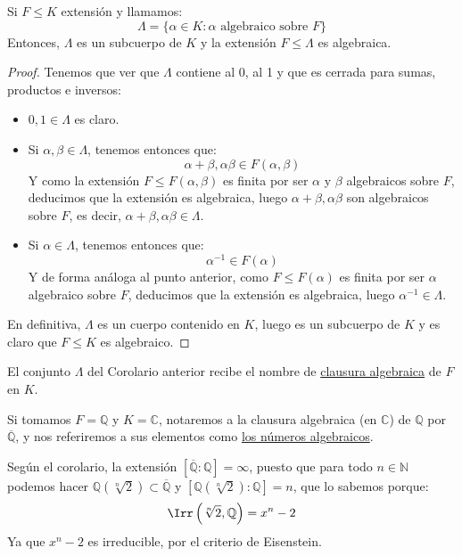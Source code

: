 \begin{coro}
    Si $F\leq K$ extensión y llamamos:
    \begin{equation*}
        \Lambda = \{\alpha\in K : \alpha \text{\ algebraico sobre\ } F\}
    \end{equation*}
    Entonces, $\Lambda$ es un subcuerpo de $K$ y la extensión $F\leq \Lambda$ es algebraica.
    \begin{proof}
        Tenemos que ver que $\Lambda$ contiene al 0, al 1 y que es cerrada para sumas, productos e inversos:
        \begin{itemize}
            \item $0,1\in \Lambda$ es claro.
            \item Si $\alpha,\beta\in \Lambda$, tenemos entonces que:
                \begin{equation*}
                    \alpha+\beta, \alpha\beta\in F(\alpha,\beta)
                \end{equation*}
                Y como la extensión $F\leq F(\alpha,\beta)$ es finita por ser $\alpha$ y $\beta$ algebraicos sobre $F$, deducimos que la extensión es algebraica, luego $\alpha+\beta,\alpha\beta$ son algebraicos sobre $F$, es decir, $\alpha+\beta,\alpha\beta\in \Lambda$.
            \item Si $\alpha\in \Lambda$, tenemos entonces que:
                \begin{equation*}
                    \alpha^{-1}\in F(\alpha)
                \end{equation*}
                Y de forma análoga al punto anterior, como $F\leq F(\alpha)$ es finita por ser $\alpha$ algebraico sobre $F$, deducimos que la extensión es algebraica, luego $\alpha^{-1}\in \Lambda$. 
        \end{itemize}
        En definitiva, $\Lambda$ es un cuerpo contenido en $K$, luego es un subcuerpo de $K$ y es claro que $F\leq K$ es algebraico.
    \end{proof}
\end{coro}

\begin{definicion}
    El conjunto $\Lambda$ del Corolario anterior recibe el nombre de \underline{clausura algebraica} de $F$ en $K$.
\end{definicion}

\begin{ejemplo}
    Si tomamos $F = \mathbb{Q}$ y $K = \mathbb{C}$, notaremos a la clausura algebraica (en $\mathbb{C}$) de $\mathbb{Q}$ por $\overline{\mathbb{Q}}$, y nos referiremos a sus elementos como \underline{los números algebraicos}.

    \noindent
    Según el corolario, la extensión $\left[\overline{\mathbb{Q}}: \mathbb{Q}\right] = \infty$, puesto que para todo $n\in \mathbb{N}$ podemos hacer $\mathbb{Q}(\sqrt[n]{2}) \subset \overline{\mathbb{Q}}$ y $[\mathbb{Q}(\sqrt[n]{2}):\mathbb{Q}] = n$, que lo sabemos porque:
    \begin{equation*}
        \Irr\left(\sqrt[n]{2}, \mathbb{Q}\right) = x^n - 2
    \end{equation*}
    Ya que $x^n-2$ es irreducible, por el criterio de Eisenstein.
\end{ejemplo}

